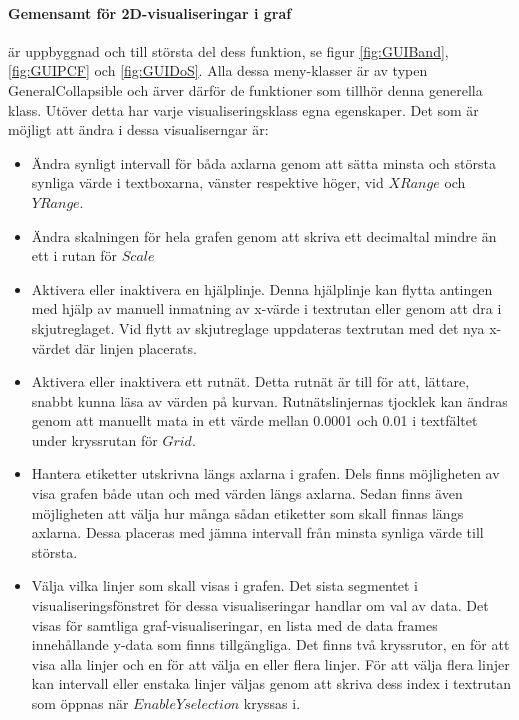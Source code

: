 \paragraph{Gemensamt för 2D-visualiseringar i graf} är uppbyggnad och till största del dess funktion, se figur \ref{fig:GUIBand}, \ref{fig:GUIPCF} och \ref{fig:GUIDoS}. Alla dessa meny-klasser är av typen GeneralCollapsible och ärver därför de funktioner som tillhör denna generella klass. Utöver detta har varje visualiseringsklass egna egenskaper. Det som är möjligt att ändra i dessa visualiserngar är:
\begin{itemize}
    \setlength\itemsep{0em}
    \item Ändra synligt intervall för båda axlarna genom att sätta minsta och största synliga värde i textboxarna, vänster respektive höger, vid $X Range$ och $Y Range$.
    \item Ändra skalningen för hela grafen genom att skriva ett decimaltal mindre än ett i rutan för $Scale$
    \item Aktivera eller inaktivera en hjälplinje. Denna hjälplinje kan flytta antingen med hjälp av manuell inmatning av x-värde i textrutan eller genom att dra i skjutreglaget. Vid flytt av skjutreglage uppdateras textrutan med det nya x-värdet där linjen placerats.
    \item Aktivera eller inaktivera ett rutnät. Detta rutnät är till för att, lättare, snabbt kunna läsa av värden på kurvan. Rutnätslinjernas tjocklek kan ändras genom att manuellt mata in ett värde mellan 0.0001 och 0.01 i textfältet under kryssrutan för $Grid$.
    \item Hantera etiketter utskrivna längs axlarna i grafen. Dels finns möjligheten av visa grafen både utan och med värden längs axlarna. Sedan finns även möjligheten att välja hur många sådan etiketter som skall finnas längs axlarna. Dessa placeras med jämna intervall från minsta synliga värde till största.
    \item Välja vilka linjer som skall visas i grafen. Det sista segmentet i visualiseringsfönstret för dessa visualiseringar handlar om val av data. Det visas för samtliga graf-visualiseringar, en lista med de data frames innehållande y-data som finns tillgängliga. Det finns två kryssrutor, en för att visa alla linjer och en för att välja en eller flera linjer. För att välja flera linjer kan intervall eller enstaka linjer väljas genom att skriva dess index i textrutan som öppnas när $Enable Y selection$ kryssas i.
\end{itemize}

